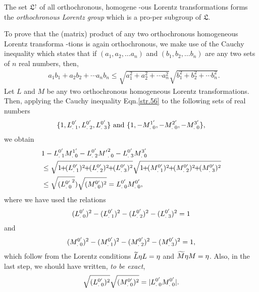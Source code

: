 \begin{small}
\lem The set $\mathfrak{L}^\uparrow$ of all orthochronous,
homogene  -ous Lorentz transformations forms the
\textsl{orthochronous   Lorentz group} which is a pro-\break per 
subgroup of $\mathfrak{L}$.

\prf {} To prove that the (matrix) product of 
any two orthochro\break nous homogeneous Lorentz transforma  
-tions is again orthochronous, we make use of the {Cauchy 
inequality} which states that if $ (a_1,a_2,\dots a_n)$ 
and  $(b_1,b_2,\dots b_n)$ are any two sets of $n$ real 
numbers, then,
\begin{align}\label{str.56}
&a_1 b_1+ a_2 b_2+\cdots a_n b_n\leq 
\sqrt{a_1^2+a_2^2+\cdots a_n^2}\sqrt{b_1^2+b_2^2
+\cdots b_n^2}.
\end{align}
Let $L$ and $M$ be any two orthochronous homogeneous  
Lorentz transformations. Then, applying the Cauchy 
inequality Eqn.\eqref{str.56} to the following sets of real 
numbers 
\begin{align} \label{str.57}
\{1, {{L}^{0'}_{.\;1}},
{{L}^{0'}_{.\;2}}, {{L}^{0'}_{.\;3}} \} \text{ and } \{1,
-{{M}^{1'}_{.\;0}}, -{{M}^{2'}_{.\;0}}, 
-{{M}^{3'}_{.\;0}} \},
\end{align}
we obtain
\begin{align*}
&1-\mtud{L}{0'}{1}\mtud{M}{1'}{0}-
\mtud{L}{0'}{2}\mtud{M'}{2}
{0}-\mtud{L}{0'}{3}\mtud{M}{3'} {0}\notag\\
&\leq \sqrt{1\nnt+\nnt(\mtud{L}{0'}{1})^2
\nnt+\nnt(\mtud{L}{0'}{2})^2 \nnt+\nnt
(\mtud{L}{0'}{3})^2}
\sqrt{1\nnt+\nnt(\mtud{M}{0'}{1})^2
\nnt+\nnt(\mtud{M}{0'}{2})^2 \nnt+\nnt 
(\mtud{M}{0'}{3})^2}\notag\\
&\leq\sqrt{(\mtud{L}{0'}{0}^2})
\sqrt{(\mtud{M}{0'}{ 0})^2}
=\mtud{L}{0'}{0}\mtud{M}{0'}{0},
\end{align*} 
where we have used the relations 
\begin{align*}
 ({{L}^{0'}_{.\;0}})^2-({{L}^{0'}_{.\;1}})^2- 
({{L}^{0'}_{.\;2}})^2 -({{L}^{0'}_{.\;3}})^2  =1                
 \end{align*}
and
\begin{align*}
 ({{M}^{0'}_{.\;0}})^2-({{M}^{0'}_{.\;1}}
)^2-({{ M}^{0'}_{.\;2}})^2 -({{M}^{0'}_{.\;3}})^2=1,
\end{align*}
which follow from the Lorentz conditions $\widetilde{L}{\eta} 
L={\eta}$ and  $\widetilde{M}{\eta} M ={\eta}$. Also, in the last step, 
we should have written, \textsl{to be exact}, 
\begin{align*}
\sqrt{({{L}^{0'}_{.\;0}})^2} \sqrt{({{M}^{0'}_{.\; 0}})^2} 
=|{{L}^{0'}_{.\;0}}{{M}^{0'}_{.\;0}}|.
\end{align*} 

\end{small}

